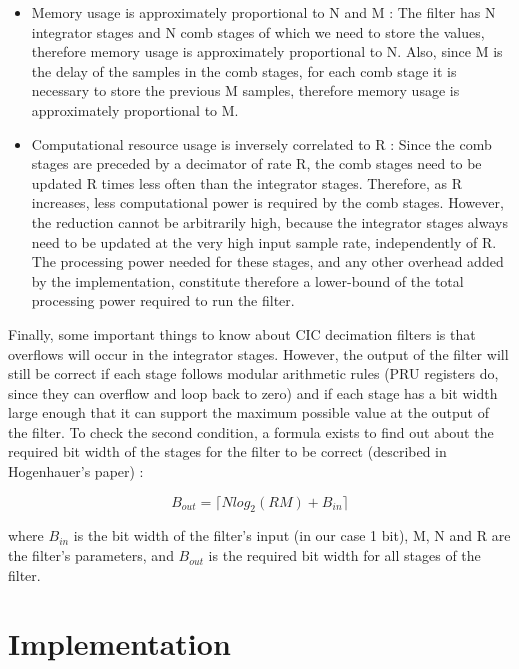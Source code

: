 \documentclass[]{report}
\providecommand{\tightlist}{%
	\setlength{\itemsep}{0pt}\setlength{\parskip}{0pt}}
\begin{document}
\begin{itemize}
\tightlist
\item
  Memory usage is approximately proportional to N and M : The filter has N integrator stages and N comb stages of which we need to store the values, therefore memory usage is approximately proportional to N. Also, since M is the delay of the samples in the comb stages, for each comb stage it is necessary to store the previous M samples, therefore memory usage is approximately proportional to M.
\item
  Computational resource usage is inversely correlated to R : Since the comb stages are preceded by a decimator of rate R, the comb stages need to be updated R times less often than the integrator stages. Therefore, as R increases, less computational power is required by the comb stages. However, the reduction cannot be arbitrarily high, because the integrator stages always need to be updated at the very high input sample rate, independently of R. The processing power needed for these stages, and any other overhead added by the implementation, constitute therefore a lower-bound of the total processing power required to run the filter.
\end{itemize}

Finally, some important things to know about CIC decimation filters is that overflows will occur in the integrator stages. However, the output of the filter will still be correct if each stage follows modular arithmetic rules (PRU registers do, since they can overflow and loop back to zero) and if each stage has a bit width large enough that it can support the maximum possible value at the output of the filter. To check the second condition, a formula exists to find out about the required bit width of the stages for the filter to be correct (described in Hogenhauer's paper) :

\begin{equation}
\label{eq:bout}
B_{out} = \lceil Nlog_2(RM) + B_{in} \rceil
\end{equation}

\noindent where \(B_{in}\) is the bit width of the filter's input (in our case 1
bit), M, N and R are the filter's parameters, and \(B_{out}\) is the
required bit width for all stages of the filter.

\hypertarget{implementation}{%
\chapter{Implementation}\label{implementation}}
\end{document}

